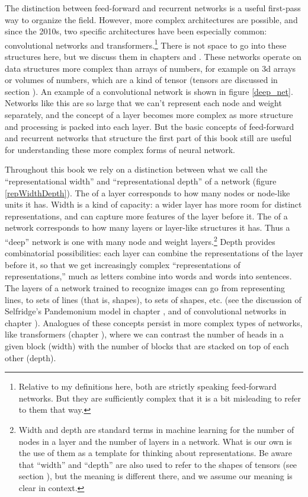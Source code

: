 The distinction between feed-forward and recurrent networks is a useful first-pass way to organize the field. However, more complex architectures are possible, and since the 2010s, two specific architectures have been especially common: convolutional networks and transformers.\footnote{Relative to my definitions here, both are strictly speaking feed-forward networks. But they are sufficiently complex that it is a bit misleading to refer to them that way.}  There is not space to go into these structures here, but we discuss them in chapters  and . These networks operate on data structures more complex than arrays of numbers, for example on 3d arrays or volumes of numbers, which are a kind of tensor (tensors are discussed in section ). An example of a convolutional network is shown in figure \ref{deep_net}. Networks like this are so large that we can't represent each node and weight separately, and the concept of a layer becomes more complex as more structure and processing is packed into each layer. But the basic concepts of feed-forward and recurrent networks that structure the first part of this book still are useful for understanding these more complex forms of neural network. 

Throughout this book we rely on a distinction between what we call the ``representational width'' and ``representational depth'' of a network (figure \ref{repWidthDepth}). The  of a layer corresponds to how many nodes or node-like units it has. Width is a kind of capacity: a wider layer has more room for distinct representations, and can capture more features of the layer before it. The  of a network corresponds to how many layers or layer-like structures it has. Thus a ``deep'' network is one with many node and weight layers.\footnote{Width and depth are standard terms in machine learning for the number of nodes in a layer and the number of layers in a network. What is our own is the use of them as a template for thinking about representations. Be aware that ``width'' and ``depth'' are also used to refer to the shapes of tensors (see section ), but the meaning is different there, and we assume our meaning is clear in context.} Depth provides combinatorial possibilities: each layer can combine the representations of the layer before it, so that we get increasingly complex ``representations of representations,'' much as letters combine into words and words into sentences. The layers of a network trained to recognize images can go from representing lines, to sets of lines (that is, shapes), to sets of shapes, etc. (see the discussion of Selfridge's Pandemonium model in chapter , and of convolutional networks in chapter ). Analogues of these concepts persist in more complex types of networks, like transformers (chapter ), where we can contrast the number of heads in a given block (width) with the number of blocks that are stacked on top of each other (depth).

